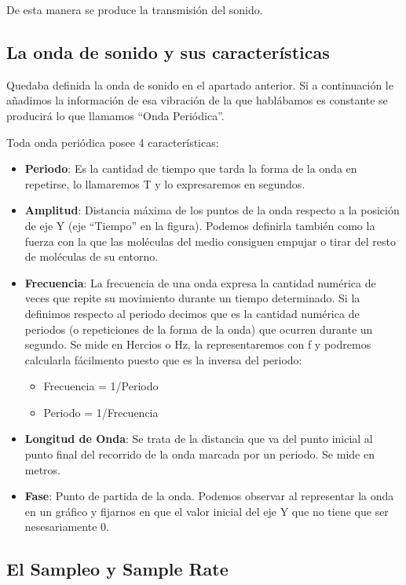 De esta manera se produce la transmisión del sonido.

\subsection{La onda de sonido y sus características}\label{sec:Ondas} 

Quedaba definida la onda de sonido en el apartado anterior. Si a continuación le añadimos la información de esa vibración de la que hablábamos es constante se producirá lo que llamamos ``Onda Periódica''.

Toda onda periódica posee 4 características:

\begin{itemize}
	\item \textbf{Periodo}: Es la cantidad de tiempo que tarda la forma de la onda en repetirse, lo llamaremos T y lo expresaremos en segundos.
	 \item \textbf{Amplitud}: Distancia máxima de los puntos de la onda respecto a la posición de eje Y (eje ``Tiempo'' en la figura). Podemos definirla también como la fuerza con la que las moléculas del medio consiguen empujar o tirar del resto de moléculas de su entorno.
    \item \textbf{Frecuencia}: La frecuencia de una onda expresa la cantidad numérica de veces que repite su movimiento durante un tiempo determinado. Si la definimos respecto al periodo decimos que es la cantidad numérica de periodos (o repeticiones de la forma de la onda) que ocurren durante un segundo. Se mide en Hercios o Hz, la representaremos con f y podremos calcularla fácilmento puesto que es la inversa del periodo:
    \begin{itemize}
    \item Frecuencia = 1/Periodo
    \item Periodo = 1/Frecuencia   
    \end{itemize}
    \item \textbf{Longitud de Onda}: Se trata de la distancia que va del punto inicial al punto final del recorrido de la onda marcada por un periodo. Se mide en metros.
    \item \textbf{Fase}: Punto de partida de la onda. Podemos observar al representar la onda en un gráfico y fijarnos en que el valor inicial del eje Y que no tiene que ser nesesariamente 0.
\end{itemize} 

\subsection{El Sampleo y Sample Rate}\label{sec:sr} 

